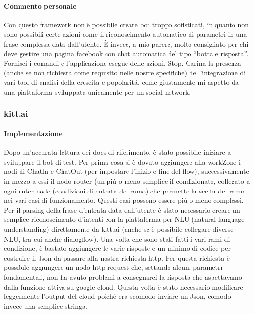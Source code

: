 \documentclass[]{article}
\begin{document}
\paragraph{Commento personale}
Con questo framework non è possibile creare bot troppo sofisticati, in quanto non sono possibili certe azioni come il riconoscimento automatico di parametri in una frase complessa data dall’utente. È invece, a mio parere, molto consigliato per chi deve gestire una pagina facebook con chat automatica del tipo “botta e risposta”. Fornisci i comandi e l’applicazione esegue delle azioni. Stop. Carina la presenza (anche se non richiesta come requisito nelle nostre specifiche) dell’integrazione di vari tool di analisi della crescita e popolaritá, come giustamente mi aspetto da una piattaforma sviluppata unicamente per un social network.


\subsubsection{kitt.ai}
\paragraph{Implementazione} 
Dopo un’accurata lettura dei docs di riferimento, è stato possibile iniziare a sviluppare il bot di test. Per prima cosa si è dovuto aggiungere alla workZone i nodi di ChatIn e ChatOut (per impostare l’inizio e fine del flow), successivamente in mezzo a essi il nodo router (un piú o meno semplice if condizionato, collegato a ogni enter node (condizioni di entrata del ramo) che permette la scelta del ramo nei vari casi di funzionamento. Questi casi possono essere piú o meno complessi. Per il parsing della frase d’entrata data dall’utente è stato necessario creare un semplice riconoscimento d’intenti con la piattaforma per NLU (natural language understanding) direttamente da kitt.ai (anche se è possibile collegare diverse NLU, tra cui anche dialogflow). Una volta che sono stati fatti i vari rami di condizione, è bastato aggiungere le varie risposte e un minimo di codice per costruire il Json da passare alla nostra richiesta http. Per questa richiesta è possibile aggiungere un nodo http request che, settando alcuni parametri fondamentali, non ha avuto problemi a consegnarci la risposta che aspettavamo dalla funzione attiva su google cloud. Questa volta è stato necessario modificare leggermente l’output del cloud poiché era scomodo inviare un Json, comodo invece una semplice stringa. 
\end{document}

